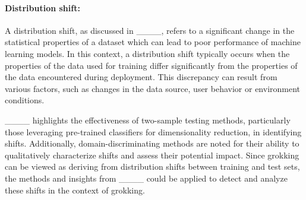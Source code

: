 \paragraph{Distribution shift:} A distribution shift, as discussed in ____, refers to a significant change in the statistical properties of a dataset which can lead to poor performance of machine learning models. In this context, a distribution shift typically occurs when the properties of the data used for training differ significantly from the properties of the data encountered during deployment. This discrepancy can result from various factors, such as changes in the data source, user behavior or environment conditions.

____ highlights the effectiveness of two-sample testing methods, particularly those leveraging pre-trained classifiers for dimensionality reduction, in identifying shifts. Additionally, domain-discriminating methods are noted for their ability to qualitatively characterize shifts and assess their potential impact. Since grokking can be viewed as deriving from distribution shifts between training and test sets, the methods and insights from ____ could be applied to detect and analyze these shifts in the context of grokking.